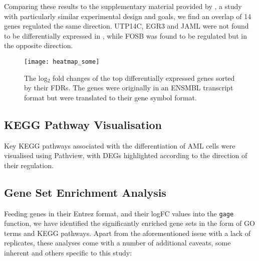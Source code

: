 Comparing these results to the supplementary material provided by \cite{gatt2021tyrosol}, a study with particularly similar experimental design and goals, we find an overlap of 14 genes regulated the same direction. UTP14C, EGR3 and JAML were not found to be differentially expressed in \cite{gatt2021tyrosol}, while FOSB was found to be regulated but in the opposite direction.


\begin{figure}[!h]
    \centering
    \texttt{[image: heatmap\_some]}
    \caption{The log$_2$ fold changes of the top differentially expressed genes sorted by their FDRs. The genes were originally in an ENSMBL transcript format but were translated to their gene symbol format.} 
    \label{fig:heatmap_some}
\end{figure}





\subsection{KEGG Pathway Visualisation}
Key KEGG pathways associated with the differentiation of \ac{AML} cells were visualised using Pathview, with \ac{DEG}s highlighted according to the direction of their regulation.



\subsection{Gene Set Enrichment Analysis}
Feeding genes in their Entrez format, and their \ac{logFC} values into the \texttt{gage} function, we have identified the significantly enriched gene sets in the form of \ac{GO} terms and \ac{KEGG} pathways. Apart from the aforementioned issue with a lack of replicates, these analyses come with a number of additional caveats, some inherent and others specific to this study:

